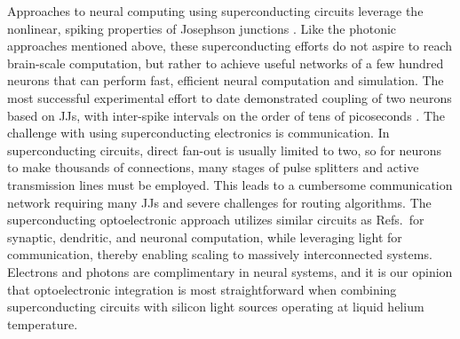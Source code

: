 \documentclass[twocolumn]{article}
\newcommand{\onlinecite}[1]{\hspace{-1 ex} \nocite{#1}\citenum{#1}}
\begin{document}
Approaches to neural computing using superconducting circuits leverage the nonlinear, spiking properties of Josephson junctions \cite{hias2007,sele2017,scdo2018}. Like the photonic approaches mentioned above, these superconducting efforts do not aspire to reach brain-scale computation, but rather to achieve useful networks of a few hundred neurons that can perform fast, efficient neural computation and simulation. The most successful experimental effort to date demonstrated coupling of two neurons based on JJs, with inter-spike intervals on the order of tens of picoseconds \cite{sele2017}. The challenge with using superconducting electronics is communication. In superconducting circuits, direct fan-out is usually limited to two, so for neurons to make thousands of connections, many stages of pulse splitters and active transmission lines must be employed. This leads to a cumbersome communication network requiring many JJs and severe challenges for routing algorithms. The superconducting optoelectronic approach utilizes similar circuits as Refs.\,\onlinecite{hias2007,sele2017,scdo2018} for synaptic, dendritic, and neuronal computation, while leveraging light for communication, thereby enabling scaling to massively interconnected systems. Electrons and photons are complimentary in neural systems, and it is our opinion that optoelectronic integration is most straightforward when combining superconducting circuits with silicon light sources operating at liquid helium temperature.
\end{document}
